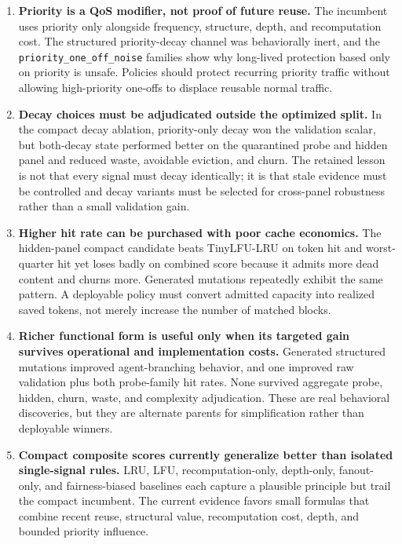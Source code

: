 \documentclass[11pt]{article}
\newcommand{\identifier}[1]{\nolinkurl{#1}}
\begin{document}
\begin{enumerate}
  \item \textbf{Priority is a QoS modifier, not proof of future reuse.}  The incumbent
  uses priority only alongside frequency, structure, depth, and recomputation cost.
  The structured priority-decay channel was behaviorally inert, and the
  \identifier{priority_one_off_noise} families show why long-lived protection based
  only on priority is unsafe.  Policies should protect recurring priority traffic
  without allowing high-priority one-offs to displace reusable normal traffic.

  \item \textbf{Decay choices must be adjudicated outside the optimized split.}  In the
  compact decay ablation, priority-only decay won the validation scalar, but both-decay
  state performed better on the quarantined probe and hidden panel and reduced waste,
  avoidable eviction, and churn.  The retained lesson is not that every signal must
  decay identically; it is that stale evidence must be controlled and decay variants
  must be selected for cross-panel robustness rather than a small validation gain.

  \item \textbf{Higher hit rate can be purchased with poor cache economics.}  The
  hidden-panel compact candidate beats TinyLFU-LRU on token hit and worst-quarter hit
  yet loses badly on combined score because it admits more dead content and churns
  more.  Generated mutations repeatedly exhibit the same pattern.  A deployable policy
  must convert admitted capacity into realized saved tokens, not merely increase the
  number of matched blocks.

  \item \textbf{Richer functional form is useful only when its targeted gain survives
  operational and implementation costs.}  Generated structured mutations improved
  agent-branching behavior, and one improved raw validation plus both probe-family hit
  rates.  None survived aggregate probe, hidden, churn, waste, and complexity
  adjudication.  These are real behavioral discoveries, but they are alternate parents
  for simplification rather than deployable winners.

  \item \textbf{Compact composite scores currently generalize better than isolated
  single-signal rules.}  LRU, LFU, recomputation-only, depth-only, fanout-only, and
  fairness-biased baselines each capture a plausible principle but trail the compact
  incumbent.  The current evidence favors small formulas that combine recent reuse,
  structural value, recomputation cost, depth, and bounded priority influence.
\end{enumerate}
\end{document}
